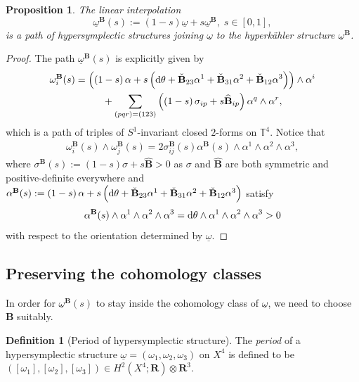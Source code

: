 \documentclass[11pt]{amsart}
\newcommand{\diff}{\text{\rm d}}
\theoremstyle{plain}
\newtheorem{proposition}[theorem]{Proposition}
\theoremstyle{definition}
\newtheorem{definition}[theorem]{Definition}
\theoremstyle{plain}
\theoremstyle{definition}
\numberwithin{equation}{section}
\numberwithin{theorem}{section}
\begin{document}
\begin{proposition}\label{linear-interp}
The linear interpolation
\begin{equation}
    \underline\omega^\mathbf{B}(s)
    := 
    \left(1-s\right)\underline\omega
    + 
    s\underline\omega^\mathbf{B}, \; s\in [0,1],
\end{equation}
is a path of hypersymplectic structures joining $\underline{\omega}$ to the hyperk\"ahler structure $\underline{\omega}^{\mathbf{B}}$.
\end{proposition}
\begin{proof}
The path $\underline\omega^\mathbf{B}(s)$ is explicitly given by
\begin{align}
\omega_i^\mathbf{B}(s)
& = 
\left( \left(1-s\right)\alpha + s\left(\diff\theta+ \check{\mathbf{B}}_{23}\alpha^1 + \check{\mathbf{B}}_{31}\alpha^2 + \check{\mathbf{B}}_{12}\alpha^3\right)\right)\wedge \alpha^i \nonumber \\
&\phantom{=}\qquad
+ 
\sum_{(pqr)=(123)}\left( \left(1-s\right)\sigma_{ip}+ s\widehat{\mathbf{B}}_{ip}\right)\alpha^q\wedge\alpha^r,
\end{align}
which is a path of triples of $S^1$-invariant closed $2$-forms on $\mathbb{T}^4$. Notice that
\begin{align*}
\omega_i^\mathbf{B}(s)\wedge\omega_j^\mathbf{B}(s)
= 
2\sigma_{ij}^\mathbf{B}(s)\alpha^\mathbf{B}(s)\wedge\alpha^1\wedge\alpha^2\wedge\alpha^3,
\end{align*}
where $\sigma^\mathbf{B}(s):=\left(1-s\right)\sigma+s\widehat{\mathbf{B}}>0$ as $\sigma$ and $\widehat{\mathbf{B}}$ are both symmetric and positive-definite everywhere and $\alpha^\mathbf{B}(s):=\left(1-s\right)\alpha + s\left(\diff\theta+ \check{\mathbf{B}}_{23}\alpha^1 + \check{\mathbf{B}}_{31}\alpha^2 + \check{\mathbf{B}}_{12}\alpha^3\right)$ satisfy
\[ 
\alpha^\mathbf{B}(s)\wedge\alpha^1\wedge\alpha^2\wedge\alpha^3
=
\diff \theta\wedge\alpha^1\wedge\alpha^2\wedge\alpha^3>0
\]
with respect to the orientation determined by $\underline\omega$.
\end{proof}

\subsection{Preserving the cohomology classes}\label{choice-of-B}
In order for $\underline\omega^\mathbf{B}(s)$ to stay inside the cohomology class of $\underline\omega$, we need to choose $\mathbf{B}$ suitably. 

\begin{definition}[Period of hypersymplectic structure]
    The \emph{period} of a hypersymplectic structure $\underline\omega=\left(\omega_1, \omega_2, \omega_3\right)$ on $X^4$ is defined to be $\left( [\omega_1], [\omega_2], [\omega_3]\right)\in H^2\left(X^4;\mathbf{R}\right)\otimes \mathbf{R}^3$.
\end{definition}
\end{document}
